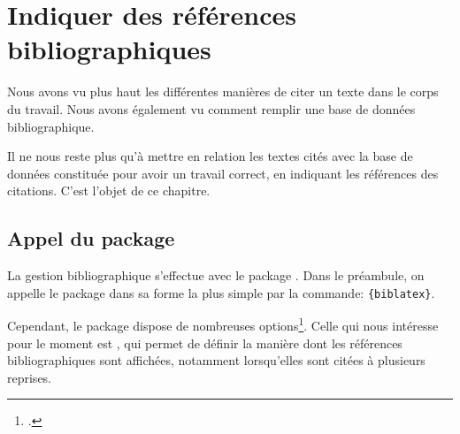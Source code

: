 \chapter{Indiquer des références bibliographiques}




\begin{prealable}
Nous avons vu plus haut les différentes manières de citer un texte dans  le corps du travail. Nous avons également vu comment remplir une base de données bibliographique.

Il ne nous reste plus qu'à mettre en relation les textes cités avec la base de données constituée pour avoir un travail correct, en indiquant les références des citations. C'est l'objet de ce chapitre.

\end{prealable}


\section[Appel du package]{Appel du package }

La gestion bibliographique s'effectue avec le package . Dans le préambule, on appelle le package dans sa forme la plus simple par la commande:
\verb|{biblatex}|.


Cependant, le package dispose de nombreuses options\footcite{biblatex_options}. Celle qui nous intéresse pour le moment est , qui permet de définir la manière dont les références bibliographiques sont affichées, notamment lorsqu'elles sont citées à plusieurs reprises.

